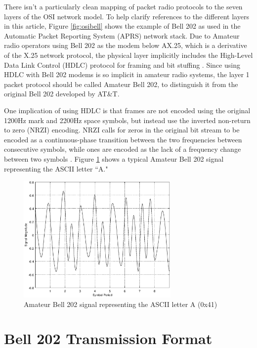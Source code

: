 \documentclass[12pt,letterpaper]{article}
\begin{document}
There isn't a particularly clean
mapping of packet radio protocols to the seven layers of the OSI
network model. To help clarify references to the different layers in this article,
Figure \ref{fig:osibell} shows the example of Bell 202 as used in the 
Automatic Packet Reporting System (APRS) network stack.
Due to Amateur radio operators
using Bell 202 as the modem below AX.25, which is a derivative of
the X.25 network protocol, 
the physical layer implicitly includes the High-Level Data Link Control (HDLC) 
protocol for framing and bit stuffing \cite{n1vgphy}.
Since using HDLC with Bell 202 modems is so implicit in amateur radio systems, 
the layer 1 packet protocol should be called Amateur Bell 202, to
distinguish it from the original Bell 202 developed by AT\&T.

One implication of using HDLC is that frames are not encoded using the
original 1200Hz mark and 2200Hz space symbols,
but instead use the
inverted non-return to zero (NRZI) encoding.
NRZI calls for zeros in the original bit stream to be encoded as a
continuous-phase transition between the two frequencies between consecutive symbols, 
while ones are encoded as
the lack of a frequency change between two symbols \cite{iso13239}.
Figure \ref{fig:bell202sample} shows a typical Amateur Bell 202
signal representing the ASCII letter ``A."

\begin{figure}
	\centering
	\includegraphics[width=0.7\textwidth]{src/octave/bell202A}
	\caption{Amateur Bell 202 signal representing the ASCII letter A (0x41)}
	\label{fig:bell202sample}
\end{figure}


\section{Bell 202 Transmission Format}
\end{document}

